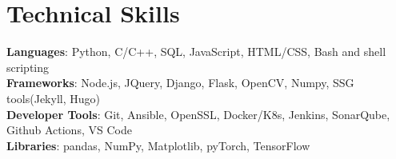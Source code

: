 \documentclass[letterpaper,11pt]{article}
\begin{document}
%
\section{Technical Skills}
 \begin{itemize}[leftmargin=0.15in, label={}]
    \small{\item{
     \textbf{Languages}{: Python, C/C++, SQL, JavaScript, HTML/CSS, Bash and shell scripting} \\
     \textbf{Frameworks}{: Node.js, JQuery, Django, Flask, OpenCV, Numpy, SSG tools(Jekyll, Hugo)} \\
     \textbf{Developer Tools}{: Git, Ansible, OpenSSL, Docker/K8s, Jenkins, SonarQube, Github Actions, VS Code} \\
      \textbf{Libraries}{: pandas, NumPy, Matplotlib, pyTorch, TensorFlow}
    }}
 \end{itemize}


\end{document}
